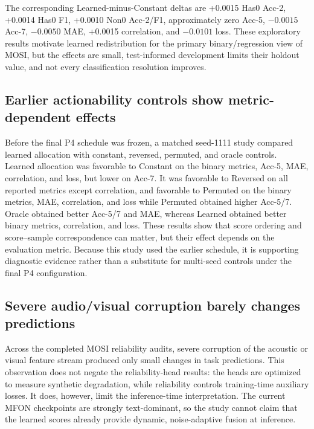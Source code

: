 The corresponding Learned-minus-Constant deltas are +0.0015 Has0 Acc-2,
+0.0014 Has0 F1, +0.0010 Non0 Acc-2/F1, approximately zero Acc-5,
\(-0.0015\) Acc-7, \(-0.0050\) MAE, +0.0015 correlation, and \(-0.0101\)
loss. These exploratory results motivate learned redistribution for the
primary binary/regression view of MOSI, but the effects are small,
test-informed development limits their holdout value, and not every
classification resolution improves.

\subsection{Earlier actionability controls show metric-dependent
effects}\label{earlier-actionability-controls-show-metric-dependent-effects}

Before the final P4 schedule was frozen, a matched seed-1111 study
compared learned allocation with constant, reversed, permuted, and
oracle controls. Learned allocation was favorable to Constant on the
binary metrics, Acc-5, MAE, correlation, and loss, but lower on Acc-7.
It was favorable to Reversed on all reported metrics except correlation,
and favorable to Permuted on the binary metrics, MAE, correlation, and
loss while Permuted obtained higher Acc-5/7. Oracle obtained better
Acc-5/7 and MAE, whereas Learned obtained better binary metrics,
correlation, and loss. These results show that score ordering and
score--sample correspondence can matter, but their effect depends on the
evaluation metric. Because this study used the earlier schedule, it is
supporting diagnostic evidence rather than a substitute for multi-seed
controls under the final P4 configuration.

\subsection{Severe audio/visual corruption barely changes
predictions}\label{severe-audiovisual-corruption-barely-changes-predictions}

Across the completed MOSI reliability audits, severe corruption of the
acoustic or visual feature stream produced only small changes in task
predictions. This observation does not negate the reliability-head
results: the heads are optimized to measure synthetic degradation, while
reliability controls training-time auxiliary losses. It does, however,
limit the inference-time interpretation. The current MFON checkpoints
are strongly text-dominant, so the study cannot claim that the learned
scores already provide dynamic, noise-adaptive fusion at inference.

